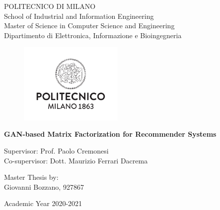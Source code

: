 \thispagestyle{empty}
\vspace*{-1.5cm} \bfseries{
\begin{center}
	\LARGE
	POLITECNICO DI MILANO\\
	\vspace*{0.3cm}
	\normalsize
	School of Industrial and Information Engineering\\
	Master of Science in Computer Science and Engineering\\
	Dipartimento di Elettronica, Informazione e Bioingegneria\\
	\vspace*{0.8cm}
	\begin{figure}[htbp]
		\begin{center}
			\includegraphics[width=5cm]{pictures/logo}
		\end{center}
	\end{figure}
	\vspace*{0.3cm} \LARGE
	\textbf{GAN-based Matrix Factorization for Recommender Systems}\\
	\vspace*{.75truecm} \large
\end{center}
\vspace*{3.0cm} \large
\begin{flushleft}
	Supervisor: Prof. Paolo Cremonesi\\
	Co-supervisor: Dott. Maurizio Ferrari Dacrema\\
\end{flushleft}
\vspace*{1.0cm}
\begin{flushright}
	Master Thesis by:\\
	Giovanni Bozzano, 927867\\
\end{flushright}
\vspace*{1.0cm}
\begin{center}
	Academic Year 2020-2021
\end{center} \clearpage
}